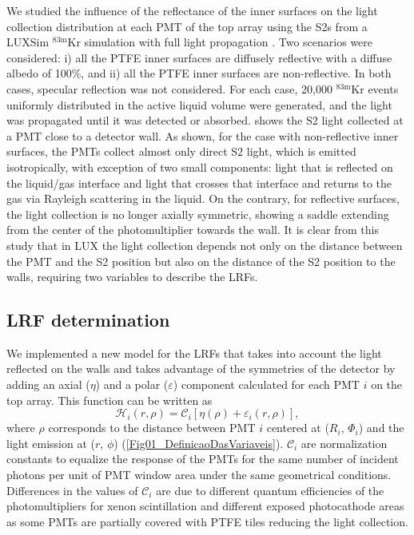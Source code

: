 \documentclass[a4paper,11pt]{article}
\begin{document}
We studied the influence of the reflectance of the inner surfaces on the light collection distribution at each PMT of the top array using the S2s from a LUXSim ${}^{\mathrm{83m}}$Kr simulation with full light propagation \cite{LUX2012_LUXSim}. Two scenarios were considered: i) all the PTFE inner surfaces are diffusely reflective with a diffuse albedo of 100\%, and ii) all the PTFE inner surfaces are non-reflective. In both cases, specular reflection was not considered. For each case, 20,000 ${}^{\mathrm{83m}}$Kr events uniformly distributed in the active liquid volume were generated, and the light was propagated until it was detected or absorbed.  shows the S2 light collected at a PMT close to a detector wall. As shown, for the case with non-reflective inner surfaces, the PMTs collect almost only direct S2 light, which is emitted isotropically, with exception of two small components: light that is reflected on the liquid/gas interface and light that crosses that interface and returns to the gas via Rayleigh scattering in the liquid. On the contrary, for reflective surfaces, the light collection is no longer axially symmetric, showing a saddle extending from the center of the photomultiplier towards the wall. It is clear from this study that in LUX the light collection  depends not only on the distance between the PMT and the S2 position but also on the distance of the S2 position to the  walls, requiring two variables to describe the LRFs. 


\subsection{LRF determination\label{subsection_LRFDetermination}}

We implemented a new model for the LRFs that takes into account the light reflected on the walls and takes advantage of the symmetries of the detector by adding an axial ($\eta$) and a polar ($\varepsilon$) component
calculated for each PMT $i$ on the top array. This function can be written as
\begin{equation}
 {\mathcal H}_i\left(r, \rho \right) = {\mathcal C}_i \left[\eta\left(\rho\right) + \varepsilon_i\left(r, \rho \right)\right],
 \label{response_function}
\end{equation}
where $\rho$ corresponds to the distance between PMT $i$ centered at ($R_i$, $\Phi_i$) and the light emission at ($r$, $\phi$) (\cref{Fig01_DefinicaoDasVariaveis}).  ${\mathcal C_i}$ are normalization constants to equalize the response of the PMTs for the same number of incident photons per unit of PMT window area under the same geometrical conditions. Differences in the values of ${\mathcal C_i}$ are due to different quantum efficiencies of the photomultipliers for xenon scintillation and different exposed photocathode areas as some PMTs are partially covered with PTFE tiles reducing the light collection.
\end{document}
